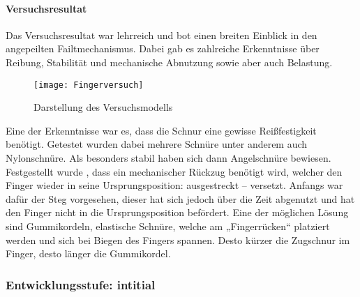 \documentclass[titlepage,12pt,twoside]{article}
\begin{document}
\paragraph{Versuchsresultat}
\label{par:Versuchsresultat}
\hfill \break
\hfill \break
Das Versuchsresultat war lehrreich und bot einen breiten Einblick in den angepeilten Failtmechanismus. 
Dabei gab es zahlreiche Erkenntnisse über Reibung, Stabilität und mechanische Abnutzung 
sowie aber auch Belastung. \\
\begin{figure}[H]
	\begin{center}
		\scalebox{0.8}
		{\texttt{[image: Fingerversuch]}}
		\caption{Darstellung des Versuchsmodells}
		\label{fig:Fingerversuch}		
	\end{center}
\end{figure}
\hfill \break
Eine der Erkenntnisse war es, dass die Schnur eine gewisse Reißfestigkeit benötigt. 
Getestet wurden dabei mehrere Schnüre unter anderem auch Nylonschnüre. Als besonders 
stabil haben sich dann Angelschnüre bewiesen.
Festgestellt wurde , dass ein mechanischer Rückzug benötigt wird, welcher den 
Finger wieder in seine Ursprungsposition: ausgestreckt – versetzt. Anfangs war dafür 
der Steg vorgesehen, dieser hat sich jedoch über die Zeit abgenutzt und hat den 
Finger nicht in die Ursprungsposition befördert. Eine der möglichen Lösung sind 
Gummikordeln, elastische Schnüre, welche am „Fingerrücken“ platziert werden und sich 
bei Biegen des Fingers spannen. Desto kürzer die Zugschnur im Finger, desto länger die 
Gummikordel. \\

\subsubsection{Entwicklungsstufe: intitial}
\label{chap:Entwicklungsstufe: intitial}
\end{document}
